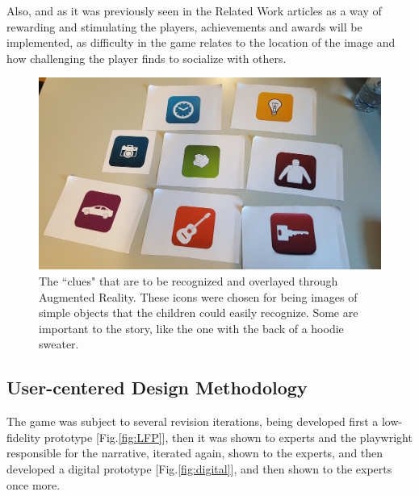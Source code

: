 \documentclass[runningheads]{llncs}
\begin{document}
\par Also, and as it was previously seen in the Related Work articles \cite{ref_article10,ref_article11,ref_article13} as a way of rewarding and stimulating the players, achievements and awards will be implemented, as difficulty in the game relates to the location of the image and how challenging the player finds to socialize with others. 

\begin{figure}
    \centering
    \includegraphics[scale = 0.3]{Icons.jpg}
    \caption{The ``clues" that are to be recognized and overlayed through Augmented Reality. These icons were chosen for being images of simple objects that the children could easily recognize. Some are important to the story, like the one with the back of a hoodie sweater.}
    \label{fig:icons}
\end{figure}

\subsection{User-centered Design Methodology}
\par The game was subject to several revision iterations, being developed first a low-fidelity prototype [Fig.\ref{fig:LFP}], then it was shown to experts and the playwright responsible for the narrative, iterated again, shown to the experts, and then developed a digital prototype [Fig.\ref{fig:digital}], and then shown to the experts once more.
\end{document}
